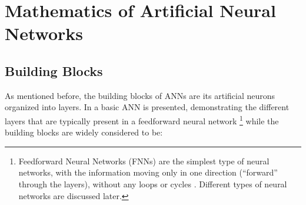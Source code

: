 \section{Mathematics of Artificial Neural Networks}
\subsection{Building Blocks}

As mentioned before, the building blocks of ANNs are its artificial
neurons organized into layers. In   a basic
ANN is presented, demonstrating the different layers that are typically
present in a feedforward neural network \footnote{Feedforward Neural Networks
  (FNNs) are the simplest type of neural networks, with the information moving
  only in one direction (``forward'' through the layers), without any loops or
  cycles \cite{article:SCHMID}. Different types of neural networks are discussed
  later.} while the building blocks are widely considered \cite{article:SCHMID} to
be:
